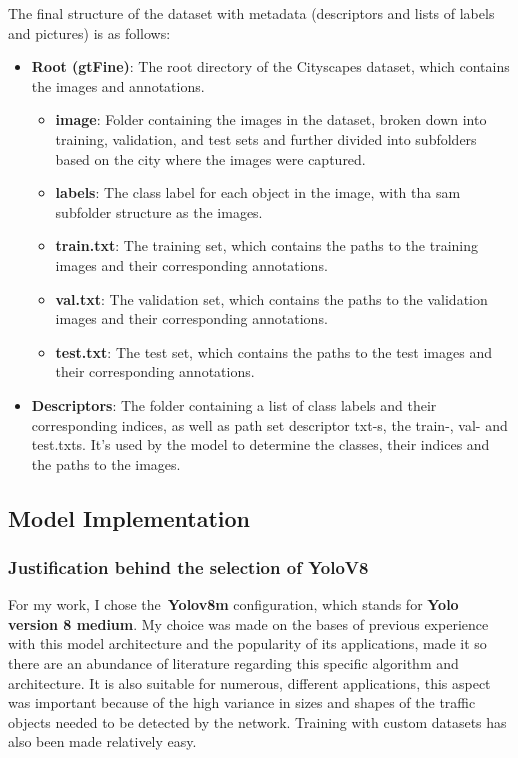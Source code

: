 The final structure of the dataset with metadata (descriptors and lists of labels and pictures) is as follows:
\begin{itemize}
    \item \textbf{Root (gtFine)}: The root directory of the Cityscapes dataset, which contains the images and annotations.
    \begin{itemize}
        \item \textbf{image}: Folder containing the images in the dataset, broken down into training, validation, and test sets
    and further divided into subfolders based on the city where the images were captured.
        \item \textbf{labels}: The class label for each object in the image, with tha sam subfolder structure as the images.
        \item \textbf{train.txt}: The training set, which contains the paths to the training images and their corresponding annotations.
        \item \textbf{val.txt}: The validation set, which contains the paths to the validation images and their corresponding annotations.
        \item \textbf{test.txt}: The test set, which contains the paths to the test images and their corresponding annotations.
    \end{itemize}
    \item \textbf{Descriptors}: The folder containing a list of class labels and their corresponding indices, as well as
    path set descriptor txt-s, the train-, val- and test.txts.
    It's used by the model to determine the classes, their indices and the paths to the images.
\end{itemize}


\subsection{Model Implementation}\label{subsec:model-implementation}


\subsubsection{Justification behind the selection of YoloV8}\label{subsubsec:justification-behind-the-selection-of-yolov8}


For my work, I chose the~\textbf{Yolov8m} configuration, which stands for \textbf{Yolo version 8 medium}.
My choice was made on the bases of previous experience with this model architecture and the popularity of its applications,
made it so there are an abundance of literature regarding this specific algorithm and architecture.
It is also suitable for numerous, different applications, this aspect was important because of the high variance in sizes and shapes of the traffic objects needed to be detected by the network.
Training with custom datasets has also been made relatively easy.

